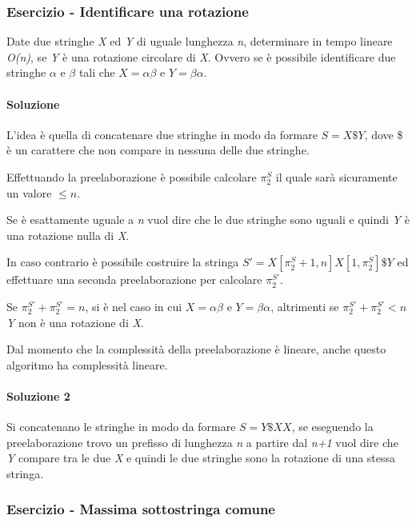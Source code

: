 \subsubsection{Esercizio - Identificare una rotazione}

Date due stringhe \textit{X} ed \textit{Y} di uguale lunghezza \textit{n}, determinare in tempo lineare \textit{O(n)}, se \textit{Y} è una rotazione circolare di \textit{X}.
Ovvero se è possibile identificare due stringhe $ \alpha $ e $ \beta $ tali che $ X = \alpha\beta $ e $ Y = \beta\alpha $.

\paragraph{Soluzione}

L'idea è quella di concatenare due stringhe in modo da formare $ S= X\$Y $, dove \$ è un carattere che non compare in nessuna delle due stringhe.

Effettuando la preelaborazione è possibile calcolare $ \pi_2^S $ il quale sarà sicuramente un valore $ \leq n $.

Se è esattamente uguale a \textit{n} vuol dire che le due stringhe sono uguali e quindi \textit{Y} è una rotazione nulla di \textit{X}.

In caso contrario è possibile costruire la stringa $ S' = X[\pi_2^S + 1,n] X[1, \pi_2^S]\$Y $ ed effettuare una seconda preelaborazione per calcolare $ \pi_2^{S'} $.

Se  $ \pi_2^{S'} + \pi_2^{S'}  = n   $, si è nel caso in cui $ X = \alpha\beta $ e $ Y = \beta\alpha $, altrimenti se $ \pi_2^{S'} + \pi_2^{S'}  < n $ \textit{Y} non è una rotazione di \textit{X}.

Dal momento che la complessità della preelaborazione è lineare, anche questo algoritmo ha complessità lineare.


\paragraph{Soluzione 2}

Si concatenano le stringhe in modo da formare $ S = Y\$XX $, se eseguendo la preelaborazione trovo un prefisso di lunghezza \textit{n} a partire dal \textit{n+1} vuol dire che \textit{Y} compare tra le due \textit{X} e quindi le due stringhe sono la rotazione di una stessa stringa.

\subsubsection{Esercizio - Massima sottostringa comune}

